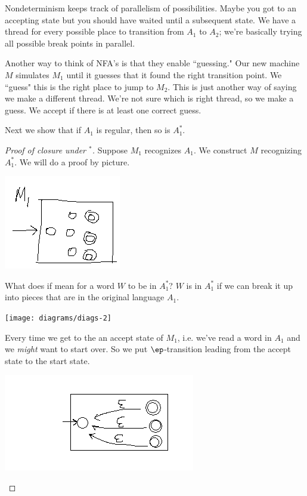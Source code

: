 Nondeterminism keeps track of parallelism of possibilities. Maybe you got to an accepting state but you should have waited until a subsequent state. We have a thread for every possible place to transition from $A_1$ to $A_2$; we're basically trying all possible break points in parallel.

Another way to think of NFA's is that they enable ``guessing." Our new machine $M$ simulates $M_1$ until it guesses that it found the right transition point. We ``guess" this is the right place to jump to $M_2$. This is just another way of saying we make a different thread. We're not sure which is right thread, so we make a guess. We accept if there is at least one correct guess.

Next we show that if $A_1$ is regular, then so is $A_1^*$.
\begin{proof}[Proof of closure under ${}^*$]
Suppose $M_1$ recognizes $A_1$. We construct $M$ recognizing $A_1^*$. We will do a proof by picture.

\begin{center}
\includegraphics{2-5}
\end{center}

What does if mean for a word $W$ to be in $A_1^*$? %
$W$ is in $A_1^*$ if we can break it up into pieces that are in the original language $A_1$.

\begin{center}
\texttt{[image: diagrams/diags-2]}
\end{center}

Every time we get to the an accept state of $M_1$, i.e. we've read a word in $A_1$ and we {\it might} want to start over. So we put $\ep$-transition leading from the accept state to the start state.

\begin{center}
\includegraphics{2-7a}
\end{center}


\end{proof}

